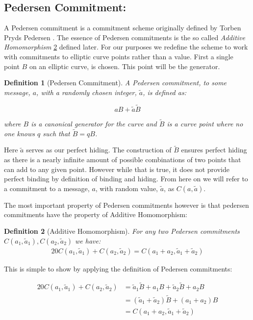 \documentclass{article}
\newtheorem{definition}{Definition}[section]
\newcommand{\eq}[1]{\begin{alignat*}{20}#1\end{alignat*}}
\newcommand{\blind}[1]{\widetilde{#1}}
\newcommand{\tB}{\widetilde{B}}
\newcommand{\ba}{\widetilde{a}}
\begin{document}
\subsection{Pedersen Commitment:}

A Pedersen commitment is a commitment scheme originally defined
by Torben Pryds Pedersen \cite{pedersen}. The essence of
Pedersen commitments is the so called \textit{Additive Homomorphism}
\ref{pedersen-additive-homomorphism} defined later. For our purposes we
redefine the scheme to work with commitments to elliptic curve points
rather than a value. First a single point $B$ on an elliptic curve,
is chosen. This point will be the generator.

\begin{definition}[Pedersen Commitment]
	A Pedersen commitment, to some message, $a$, with a randomly chosen
	integer, $\ba$, is defined as:

	$$aB + \ba\blind{B}$$

	where $B$ is a canonical generator for the curve and $\tB$
	is a curve point where no one knows $q$ such that $\tB = qB$.
\end{definition}

Here $\widetilde{a}$ serves as our perfect hiding. The construction
of $\tB$ ensures perfect hiding as there is a nearly infinite amount
of possible combinations of two points that can add to any given
point. However while that is true, it does not provide perfect binding
by definition of binding and hiding. From here on we will refer to
a commitment to a message, $a$, with random value, $\widetilde{a}$,
as $C(a,\widetilde{a})$.

The most important property of Pedersen commitments however is
that pedersen commitments have the property of Additive Homomorphism:

\begin{definition}[Additive Homomorphism] \label{pedersen-additive-homomorphism}
	For any two Pedersen commitments $C(a_1,\ba_1), C(a_2,\ba_2)$ we have:
	\eq{
		C(a_1,\ba_1) + C(a_2,\ba_2) = C(a_1 + a_2, \ba_1 + \ba_2)
	}
\end{definition}

This is simple to show by applying the definition of Pedersen
commitments: 

\eq{
	C(a_1,\ba_1) + C(a_2,\ba_2) &= \ba_1\tB + a_1B  + \ba_2\tB + a_2B \\
	                            &= (\ba_1 + \ba_2)\tB + (a_1 + a_2)B \\
	                            &= C(a_1 + a_2, \ba_1 + \ba_2)
}
\end{document}
